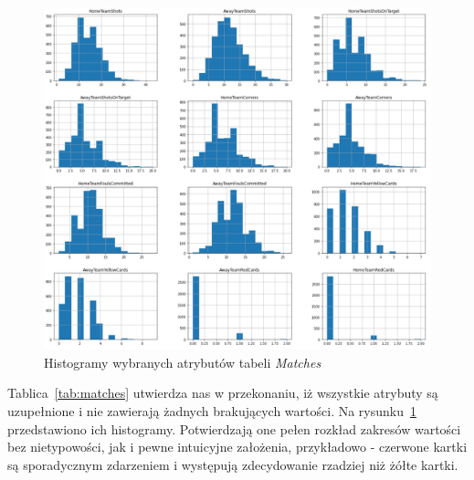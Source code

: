      \begin{figure}[H] 
        \centering\includegraphics[width=\textwidth]{figures/matches.png}
        \caption{Histogramy wybranych atrybutów tabeli \emph{Matches}}
        \label{fig:matches}
    \end{figure}
    
    \noindent Tablica~\ref{tab:matches} utwierdza nas w przekonaniu, iż wszystkie atrybuty są uzupełnione i nie zawierają żadnych brakujących wartości.
    Na rysunku~\ref{fig:matches} przedstawiono ich histogramy. Potwierdzają one pełen rozkład zakresów wartości bez nietypowości, jak i pewne intuicyjne założenia, przykładowo - czerwone kartki są sporadycznym zdarzeniem i występują zdecydowanie rzadziej niż żółte kartki. 
    
